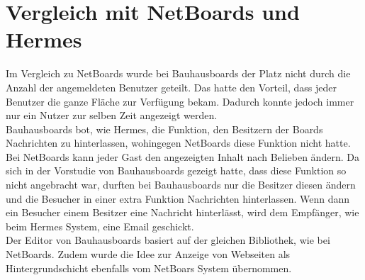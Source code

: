 


















\section{Vergleich mit NetBoards und Hermes}\label{Vergleich zu Hermes und Netboards}
Im Vergleich zu NetBoards wurde bei Bauhausboards der Platz nicht durch die Anzahl der angemeldeten Benutzer geteilt.
Das hatte den Vorteil, dass jeder Benutzer die ganze Fläche zur Verfügung bekam.
Dadurch konnte jedoch immer nur ein Nutzer zur selben Zeit angezeigt werden.
\\
Bauhausboards bot, wie Hermes, die Funktion, den Besitzern der Boards Nachrichten zu hinterlassen, wohingegen NetBoards diese Funktion nicht hatte.
\\
Bei NetBoards kann jeder Gast den angezeigten Inhalt nach Belieben ändern.
Da sich in der Vorstudie von Bauhausboards gezeigt hatte, dass diese Funktion so nicht angebracht war, durften bei Bauhausboards nur die Besitzer diesen ändern und die Besucher in einer extra Funktion Nachrichten hinterlassen.
Wenn dann ein Besucher einem Besitzer eine Nachricht hinterlässt, wird dem Empfänger, wie beim Hermes System, eine Email geschickt.
\\
Der Editor von Bauhausboards basiert auf der gleichen Bibliothek, wie bei NetBoards. Zudem wurde die Idee zur Anzeige von Webseiten als Hintergrundschicht ebenfalls vom NetBoars System übernommen.
